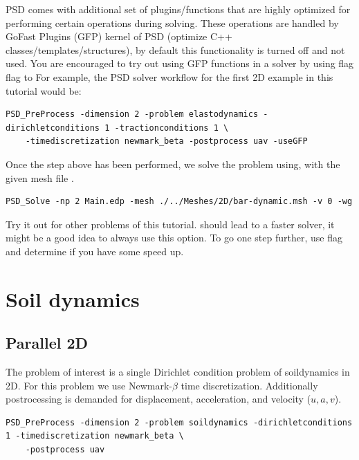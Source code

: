PSD comes with additional set of plugins/functions that are highly optimized for performing certain operations during solving. These operations are handled by GoFast Plugins (GFP) kernel of PSD (optimize C++ classes/templates/structures), by default this functionality is turned off and not used. You are encouraged to try out using GFP functions in a solver by using  flag flag to  For example, the PSD solver workflow for the first 2D example in this tutorial would be:

\begin{lstlisting}[style=BashInputStyle]
	PSD_PreProcess -dimension 2 -problem elastodynamics -dirichletconditions 1 -tractionconditions 1 \
	-timediscretization newmark_beta -postprocess uav -useGFP
\end{lstlisting}

Once the step above has been performed, we solve the problem using, with the given mesh file . 

\begin{lstlisting}[style=BashInputStyle]
	PSD_Solve -np 2 Main.edp -mesh ./../Meshes/2D/bar-dynamic.msh -v 0 -wg
\end{lstlisting}

Try it out for other problems of this tutorial.  should lead to a faster solver, it might be a good idea to always use this option. To go one step further, use  flag and determine if you have some speed up.


\pagebreak

\section{Soil dynamics}

\subsection{Parallel 2D}

The problem of interest is a single Dirichlet condition problem of soildynamics in 2D. For this problem we use Newmark-$\beta$ time discretization. Additionally postrocessing is demanded for displacement, acceleration, and velocity ($u,a,v$).

\begin{lstlisting}[style=BashInputStyle]
	PSD_PreProcess -dimension 2 -problem soildynamics -dirichletconditions 1 -timediscretization newmark_beta \
	-postprocess uav
\end{lstlisting}

